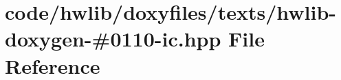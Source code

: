 \hypertarget{hwlib-doxygen-#0110-ic_8hpp}{}\section{code/hwlib/doxyfiles/texts/hwlib-\/doxygen-\/\#0110-\/ic.hpp File Reference}
\label{hwlib-doxygen-#0110-ic_8hpp}
